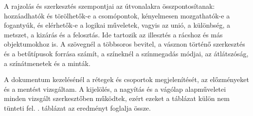 A rajzolás és szerkesztés szempontjai az útvonalakra összpontosítanak: hozzáadhatók és törölhetők-e a csomópontok, kényelmesen mozgathatók-e a fogantyúk, és elérhetők-e a logikai műveletek, vagyis az unió, a különbség, a metszet, a kizárás és a felosztás. Ide tartozik az illesztés a rácshoz és más objektumokhoz is. A szövegnél a többsoros bevitel, a vásznon történő szerkesztés és a betűtípusok forrása számít, a színeknél a színmegadás módjai, az átlátszóság, a színátmenetek és a minták.

A dokumentum kezelésénél a rétegek és csoportok megjelenítését, az előzményeket és a mentést vizsgáltam. A kijelölés, a nagyítás és a vágólap alapműveletei minden vizsgált szerkesztőben működtek, ezért ezeket a táblázat külön nem tünteti fel. . táblázat az eredményt foglalja össze.

